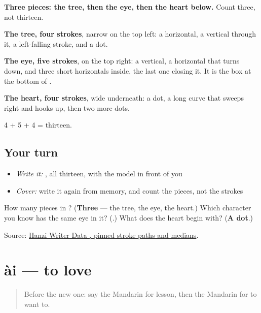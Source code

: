 \begin{quote}
\end{quote}

\textbf{Three pieces: the tree, then the eye, then the heart below.} Count three, not thirteen.

\textbf{The tree, four strokes}, narrow on the top left: a horizontal, a vertical through it, a left-falling stroke, and a dot.

\textbf{The eye, five strokes}, on the top right: a vertical, a horizontal that turns down, and three short horizontals inside, the last one closing it. It is the box at the bottom of .

\textbf{The heart, four strokes}, wide underneath: a dot, a long curve that sweeps right and hooks up, then two more dots.

4 + 5 + 4 = thirteen.

\subsection*{Your turn}
\begin{itemize}
\raggedright
  \item \emph{Write it:} , all thirteen, with the model in front of you
  \item \emph{Cover:} write it again from memory, and count the pieces, not the strokes
\end{itemize}

\begin{tcolorbox}[breakable,colback=teal!4,colframe=teal!35!black,title={Before you move on}]
How many pieces in ? (\textbf{Three} — the tree, the eye, the heart.) Which character you know has the same eye in it? (\textbf{}.) What does the heart begin with? (\textbf{A dot}.)

Source: \href{https://raw.githubusercontent.com/chanind/hanzi-writer-data/68d10a4b21150cae5e1ebbd223eed289cf32d90c/data/\%E6\%83\%B3.json}{Hanzi Writer Data , pinned stroke paths and medians}.
\end{tcolorbox}
\section[ài]{ài — to love}

\label{lesson:ZH-C55-ai}



\begin{quote}
Before the new one: say the Mandarin for lesson, then the Mandarin for to want to.
\end{quote}

